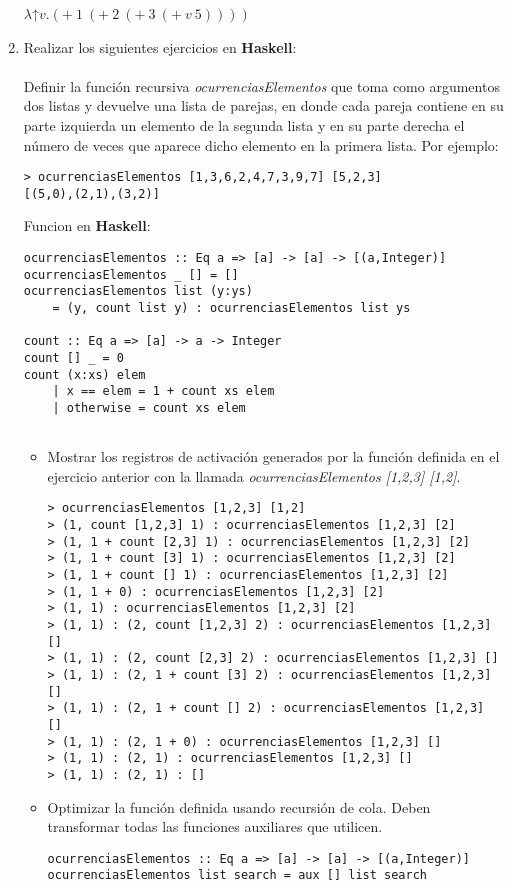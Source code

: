 \documentclass[12pt,letterpaper]{article}
\begin{document}
\begin{enumerate}
    $\lambda$↑$v.(+\ 1\ (+\ 2\ (+\ 3\ (+\ v \ 5))))$
    \item Realizar los siguientes ejercicios en \textbf{Haskell}:
    \\ \\
    Definir la función recursiva \textit{ocurrenciasElementos} que toma como argumentos dos listas y devuelve una lista de parejas, en donde cada pareja contiene en su parte izquierda un elemento de la segunda lista y en su parte derecha el número de veces que aparece dicho elemento en la primera lista. Por ejemplo:
\begin{verbatim}
> ocurrenciasElementos [1,3,6,2,4,7,3,9,7] [5,2,3]
[(5,0),(2,1),(3,2)]
\end{verbatim}

Funcion en \textbf{Haskell}:

\begin{verbatim}
ocurrenciasElementos :: Eq a => [a] -> [a] -> [(a,Integer)]
ocurrenciasElementos _ [] = []
ocurrenciasElementos list (y:ys)
    = (y, count list y) : ocurrenciasElementos list ys

count :: Eq a => [a] -> a -> Integer
count [] _ = 0
count (x:xs) elem
    | x == elem = 1 + count xs elem
    | otherwise = count xs elem
    
\end{verbatim}

    \begin{itemize}
        \item Mostrar los registros de activación generados por la función definida en el ejercicio anterior con la llamada \textit{ocurrenciasElementos [1,2,3] [1,2]}.
\begin{verbatim}
> ocurrenciasElementos [1,2,3] [1,2]
> (1, count [1,2,3] 1) : ocurrenciasElementos [1,2,3] [2]
> (1, 1 + count [2,3] 1) : ocurrenciasElementos [1,2,3] [2]
> (1, 1 + count [3] 1) : ocurrenciasElementos [1,2,3] [2]
> (1, 1 + count [] 1) : ocurrenciasElementos [1,2,3] [2]
> (1, 1 + 0) : ocurrenciasElementos [1,2,3] [2]
> (1, 1) : ocurrenciasElementos [1,2,3] [2]
> (1, 1) : (2, count [1,2,3] 2) : ocurrenciasElementos [1,2,3] []
> (1, 1) : (2, count [2,3] 2) : ocurrenciasElementos [1,2,3] []
> (1, 1) : (2, 1 + count [3] 2) : ocurrenciasElementos [1,2,3] []
> (1, 1) : (2, 1 + count [] 2) : ocurrenciasElementos [1,2,3] []
> (1, 1) : (2, 1 + 0) : ocurrenciasElementos [1,2,3] []
> (1, 1) : (2, 1) : ocurrenciasElementos [1,2,3] []
> (1, 1) : (2, 1) : []
\end{verbatim}
        \item Optimizar la función definida usando recursión de cola. Deben transformar todas las funciones auxiliares que utilicen.
\begin{verbatim}
ocurrenciasElementos :: Eq a => [a] -> [a] -> [(a,Integer)]
ocurrenciasElementos list search = aux [] list search


\end{verbatim}
\end{itemize}
\end{enumerate}
\end{document}
